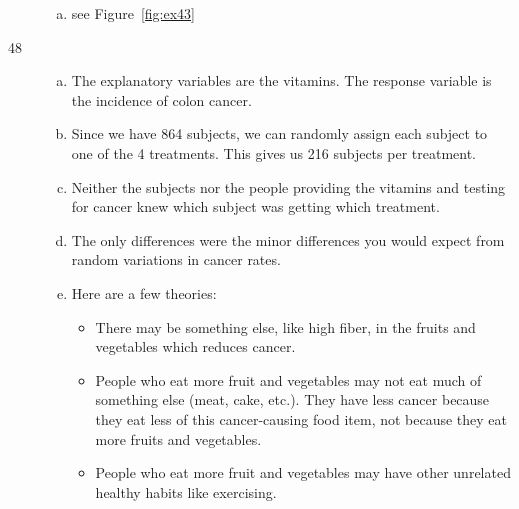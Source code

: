 \documentclass[letterpaper]{exam}
\begin{document}
\begin{description}
\begin{enumerate}[(a)]
          \item see Figure~\ref{fig:ex43}
        \end{enumerate}

      \item[48] 
        \begin{enumerate}[(a)]
          \item The explanatory variables are the vitamins.  The response
            variable is the incidence of colon cancer.

          \item Since we have 864 subjects, we can randomly assign each subject to
            one of the 4 treatments.  This gives us 216 subjects per
            treatment.

          \item Neither the subjects nor the people providing the vitamins and
            testing for cancer knew which subject was getting which treatment.

          \item The only differences were the minor differences you would expect
            from random variations in cancer rates.

          \item Here are a few theories:
            \begin{itemize}
              \item There may be something else, like high fiber, in the fruits
                and vegetables which reduces cancer.  

              \item People who eat more fruit and vegetables may not eat much of
                something else (meat, cake, etc.).  They have less cancer
                because they eat less of this cancer-causing food item, not
                because they eat more fruits and vegetables.

              \item People who eat more fruit and vegetables may have other
                unrelated healthy habits like exercising.
            \end{itemize}
        \end{enumerate}
  \end{description}
\end{document}
